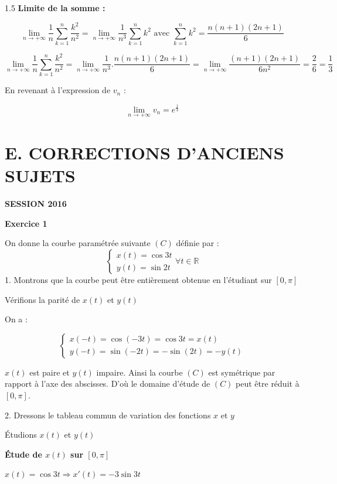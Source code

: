 \documentclass[12pt]{article}
\begin{document}
\begin{spacing}{1.5}
\medskip
\textbf{Limite de la somme :}

\[\lim_{n\to +\infty} \frac{1}{n}\sum_{k=1}^n\frac{k^2}{n^2}=\lim_{n\to +\infty}\frac{1}{n^3}\sum_{k=1}^n k^2 \text{ avec } \sum_{k=1}^n k^2=\frac{n(n+1)(2n+1)}{6}\]

\[\lim_{n\to +\infty} \frac{1}{n}\sum_{k=1}^n\frac{k^2}{n^2}=\lim_{n\to +\infty}\frac{1}{n^3}.\frac{n(n+1)(2n+1)}{6}=\lim_{n\to +\infty}\frac{(n+1)(2n+1)}{6n^2}=\frac{2}{6}=\frac{1}{3}\]

\medskip
En revenant à l'expression de $v_n$ :

\[\lim_{n\to +\infty}v_n=e^{\frac{1}{3}}\]










\newpage


\section*{\textbf{E. CORRECTIONS D'ANCIENS SUJETS}}

\medskip\textbf{SESSION 2016}

\medskip\textbf{Exercice 1}

On donne la courbe paramétrée suivante $(C)$ définie par : 
\[
\begin{cases}
x(t)=\cos{3t}\\
y(t)=\sin{2t}
\end{cases}\forall {t\in \mathbb{R}}
\]
1. Montrons que la courbe peut être entièrement obtenue en l'étudiant sur $[0,\pi]$

Vérifions la parité de $x(t)$ et $y(t)$

On a :

\[             
\begin{cases}  
x(-t)=\cos{(-3t)}=\cos{3t}=x(t)\\
y(-t)=\sin{(-2t)}=-\sin{(2t)}=-y(t)
\end{cases}
\]

$x(t)$ est paire et $y(t)$ impaire. Ainsi la courbe $(C)$ est symétrique par rapport à l'axe des abscisses. D'où le domaine d'étude de $(C)$ peut être réduit à $[0,\pi]$.

2. Dressons le tableau commun de variation des fonctions $x$ et $y$

\medskip Étudions $x(t)$ et $y(t)$

\textbf{Étude de $x(t)$ sur $[0,\pi]$}

$x(t)=\cos{3t}\Rightarrow x'(t)=-3\sin 3t$


\end{spacing}
\end{document}
